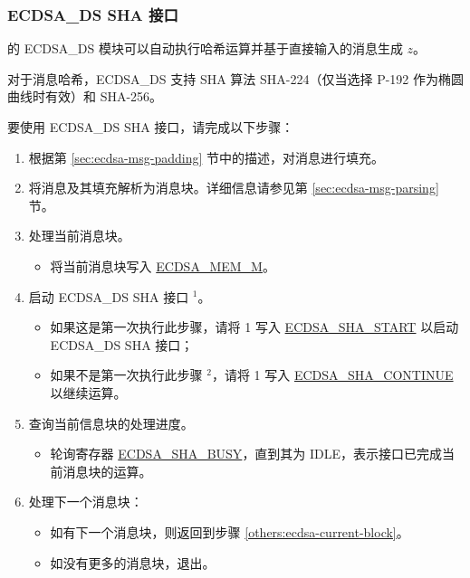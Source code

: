 \documentclass[main\_\_CN.tex]{subfiles}
\begin{document}
\subsubsection{ECDSA\_DS SHA 接口}
\label{sec:ecdsa-sha-interface}
\chipseries{} 的 ECDSA\_DS 模块可以自动执行哈希运算并基于直接输入的消息生成 $z$。

对于消息哈希，ECDSA\_DS 支持 SHA 算法 SHA-224（仅当选择 P-192 作为椭圆曲线时有效）和 SHA-256。

要使用 ECDSA\_DS SHA 接口，请完成以下步骤：

\begin{enumerate}
	\item 根据第 \ref{sec:ecdsa-msg-padding} 节中的描述，对消息进行填充。
	\item 将消息及其填充解析为消息块。详细信息请参见第 \ref{sec:ecdsa-msg-parsing} 节。
	\item \label{others:ecdsa-current-block} 处理当前消息块。
	      \begin{itemize}
		      \item 将当前消息块写入 \hyperref[tab:ecdsa-memory]{ECDSA\_MEM\_M}。
	      \end{itemize}
	\item 启动 ECDSA\_DS SHA 接口 \hyperref[others:ecdsa-note-sha]{$^1$}。
	      \begin{itemize}
		      \item 如果这是第一次执行此步骤，请将 1 写入 \hyperref[fielddesc:ECDSASHASTART]{ECDSA\_SHA\_START} 以启动 ECDSA\_DS SHA 接口；
		      \item 如果不是第一次执行此步骤 \hyperref[others:ecdsa-note-sha]{$^2$}，请将 1 写入 \hyperref[fielddesc:ECDSASHACONTINUE]{ECDSA\_SHA\_CONTINUE} 以继续运算。
	      \end{itemize}
	\item 查询当前信息块的处理进度。
	      \begin{itemize}
		      \item 轮询寄存器 \hyperref[fielddesc:ECDSASHABUSY]{ECDSA\_SHA\_BUSY}，直到其为 IDLE，表示接口已完成当前消息块的运算。
	      \end{itemize}

	\item 处理下一个消息块：
	      \begin{itemize}
		      \item 如有下一个消息块，则返回到步骤 \ref{others:ecdsa-current-block}。
		      \item 如没有更多的消息块，退出。
	      \end{itemize}

\end{enumerate}
\end{document}
